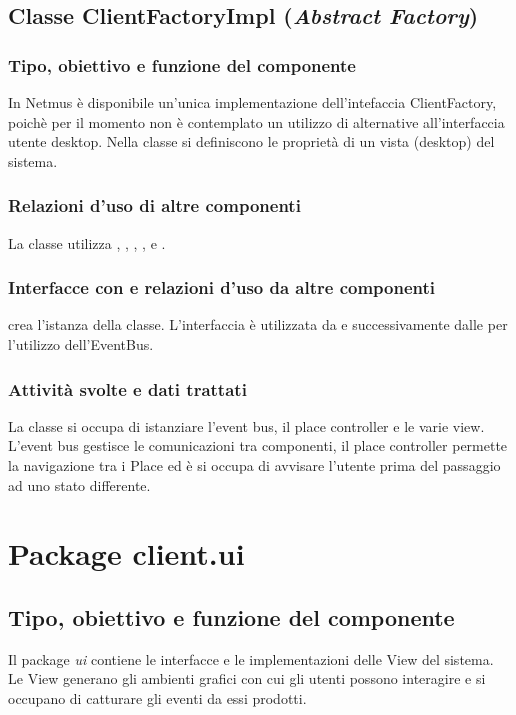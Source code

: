 \subsection{Classe ClientFactoryImpl (\emph{Abstract Factory})}
\subsubsection*{Tipo, obiettivo e funzione del componente}
In Netmus \`e disponibile un'unica implementazione dell'intefaccia
ClientFactory, poich\`e per il momento non \`e contemplato un utilizzo di
alternative all'interfaccia utente desktop.
Nella classe si definiscono le propriet\`a di un vista (desktop) del
sistema.

\subsubsection*{Relazioni d'uso di altre componenti}
La classe utilizza , , ,
,  e
.
\subsubsection*{Interfacce con e relazioni d'uso da altre componenti}
 crea l'istanza della classe. L'interfaccia  \`e
utilizzata da  e successivamente dalle  per
l'utilizzo dell'EventBus.
\subsubsection*{Attivit\`a svolte e dati trattati}
La classe si occupa di istanziare l'event bus, il place controller e le varie
view. L'event bus gestisce le comunicazioni tra componenti, il place
controller permette la navigazione tra i Place ed \`e si occupa di avvisare
l'utente prima del passaggio ad uno stato differente.


\newpage
\section{Package client.ui} %
\subsection*{Tipo, obiettivo e funzione del componente}
Il package \emph{ui} contiene le interfacce e le implementazioni delle View del
sistema. Le View generano gli ambienti grafici con cui gli utenti possono
interagire e si occupano di catturare gli eventi da essi prodotti.
